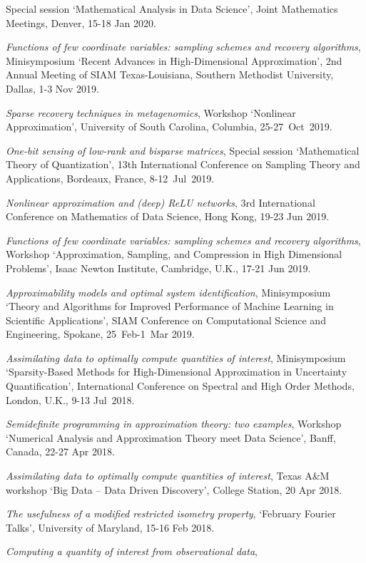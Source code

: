 \documentclass[11pt]{article}
\begin{document}
Special session `Mathematical Analysis in Data Science',
Joint Mathematics Meetings,
Denver, 15-18 Jan 2020.
\item {\sl Functions of few coordinate variables: sampling schemes and recovery algorithms},
Minisymposium  `Recent Advances in High-Dimensional Approximation',
2nd Annual Meeting of SIAM Texas-Louisiana,
Southern Methodist University, Dallas,
1-3 Nov 2019.
\item {\sl Sparse recovery techniques in metagenomics}, Workshop `Nonlinear Approximation',
University of South Carolina, Columbia, 25-27~Oct~2019.
\item {\sl One-bit sensing of low-rank and bisparse matrices}, 
Special session `Mathematical Theory of Quantization',
13th International Conference on Sampling Theory and Applications, 
Bordeaux, France,  \mbox{8-12~Jul~2019}.
\item {\sl Nonlinear approximation and (deep) ReLU networks},
3rd International Conference on Mathematics of Data Science,
Hong Kong, 19-23 Jun 2019.
\item {\sl Functions of few coordinate variables: sampling schemes and recovery algorithms},
 Workshop  `Approximation, Sampling, and Compression in High Dimensional Problems',
Isaac Newton Institute, Cambridge, U.K., 17-21 Jun 2019. 
\item {\sl Approximability models and optimal system identification}, Minisymposium `Theory and Algorithms for Improved Performance of Machine Learning in Scientific Applications',
SIAM Conference on Computational Science and Engineering, Spokane, 25~Feb-1~Mar 2019.
\item {\sl Assimilating data to optimally compute quantities of interest}, Minisymposium `Sparsity-Based \mbox{Methods} for High-Dimensional Approximation in Uncertainty Quantification',
International Conference on Spectral and High Order Methods,
London, U.K., 9-13 Jul~2018.
\item {\sl Semidefinite programming in approximation theory: two examples}, Workshop `Numerical Analysis and Approximation Theory meet Data Science', Banff, Canada, 22-27 Apr 2018.
\item {\sl Assimilating data to optimally compute quantities of interest}, 
Texas A\&M workshop `Big Data -- Data Driven Discovery', 
College Station, 20 Apr 2018.
\item {\sl The usefulness of a modified restricted isometry property}, `February Fourier Talks', University of Maryland, 15-16 Feb 2018.
\item {\sl Computing a quantity of interest from observational data}, 
\end{document}
